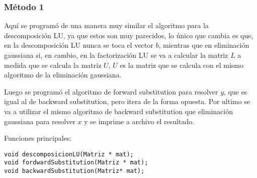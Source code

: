 \documentclass[a4paper]{article}
\begin{document}
\subsubsection{Método 1}
Aquí se programó de una manera muy similar el algoritmo para la descomposición LU, ya que estos son muy parecidos, lo único que cambia es que, en la descomposición LU nunca se toca el vector $b$, mientras que en eliminación gaussiana si, en cambio, en la factorización LU se va a calcular la matriz $L$ a medida que se calcula la matriz $U$, $U$ es la matriz que se calcula con el mismo algoritmo de la eliminación gaussiana.\par
Luego se programó el algoritmo de forward substitution para resolver $y$, que es igual al de backward substitution, pero itera de la forma opuesta. Por ultimo se va a utilizar el mismo algoritmo de backward substitution que eliminación gaussiana para resolver $x$ y se imprime a archivo el resultado.\par
\smallskip
Funciones principales:
\begin{lstlisting}
void descomposicionLU(Matriz * mat);
void fordwardSubstitution(Matriz * mat);
void backwardSubstitution(Matriz* mat);
\end{lstlisting}
\end{document}
